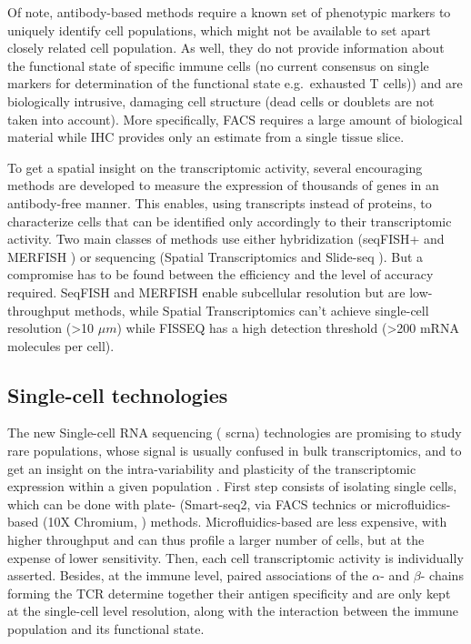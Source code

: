 Of note, antibody-based methods require a known set of phenotypic
markers to uniquely identify cell populations, which might not be
available to set apart closely related cell population. As well, they do
not provide information about the functional state of specific immune
cells (no current consensus on single markers for determination of the
functional state e.g.~exhausted T cells)) and are biologically
intrusive, damaging cell structure (dead cells or doublets are not taken
into account). More specifically, FACS requires a large amount of
biological material while IHC provides only an estimate from a single
tissue slice.

To get a spatial insight on the transcriptomic activity, several
encouraging methods are developed to measure the expression of thousands
of genes in an antibody-free manner. This enables, using transcripts
instead of proteins, to characterize cells that can be identified only
accordingly to their transcriptomic activity. Two main classes of
methods use either hybridization (seqFISH+
\autocite{eng_etal19} and MERFISH
\autocite{chen_etal15}) or
sequencing (Spatial Transcriptomics
\autocite{stahl_etal16} and Slide-seq
\autocite{rodriques_etal19}). But
a compromise has to be found between the efficiency and the level of
accuracy required. SeqFISH and MERFISH enable subcellular resolution but
are low-throughput methods, while Spatial Transcriptomics can't achieve
single-cell resolution (\textgreater10 \(\mu m\)) while FISSEQ has a
high detection threshold (\textgreater200 mRNA molecules per cell).


\subsection{Single-cell technologies}
\label{single-cell-technologies}

The new Single-cell RNA sequencing ( \acrshort{scrna}) technologies are
promising to study rare populations, whose signal is usually confused in
bulk transcriptomics, and to get an insight on the intra-variability and
plasticity of the transcriptomic expression within a given population
\autocite{giladi_amit18}. First
step consists of isolating single cells, which can be done with plate-
(Smart-seq2, \autocite{picelli_etal13} via FACS technics or microfluidics-based (10X Chromium,
\autocite{zheng_etal17}) methods.
Microfluidics-based are less expensive, with higher throughput and can
thus profile a larger number of cells, but at the expense of lower
sensitivity. Then, each cell transcriptomic activity is individually
asserted. Besides, at the immune level, paired associations of the
\(\alpha\)- and \(\beta\)- chains forming the TCR determine together
their antigen specificity and are only kept at the single-cell level
resolution, along with the interaction between the immune population and
its functional state.

